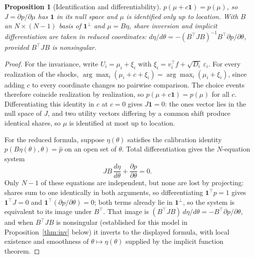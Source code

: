 \documentclass[12pt]{article}
\newtheorem{proposition}{Proposition}
\theoremstyle{remark}
\begin{document}
\begin{proposition}[Identification and differentiability]\label{prop:ident}
$p(\mu + c\mathbf{1}) = p(\mu)$, so $J = \partial p/\partial \mu$ has
$\mathbf{1}$ in its null space and $\mu$ is identified only up to location.
With $B$ an $N \times (N-1)$ basis of $\mathbf{1}^\perp$ and $\mu = B\eta$,
share inversion and implicit differentiation are taken in reduced coordinates:
$d\eta/d\theta = -(B^\top J B)^{-1} B^\top \partial p/\partial\theta$,
provided $B^\top J B$ is nonsingular.
\end{proposition}
\begin{proof}
For the invariance, write $U_i = \mu_i + \xi_i$ with $\xi_i = v_i^\top f
+ \sqrt{D_i}\,\varepsilon_i$. For every realization of the shocks,
$\arg\max_i (\mu_i + c + \xi_i) = \arg\max_i (\mu_i + \xi_i)$, since
adding $c$ to every coordinate changes no pairwise comparison. The choice
events therefore coincide realization by realization, so $p(\mu +
c\mathbf{1}) = p(\mu)$ for all $c$. Differentiating this identity in $c$
at $c = 0$ gives $J\mathbf{1} = 0$: the ones vector lies in the null space
of $J$, and two utility vectors differing by a common shift produce
identical shares, so $\mu$ is identified at most up to location.

For the reduced formula, suppose $\eta(\theta)$ satisfies the calibration
identity $p(B\eta(\theta), \theta) = \hat p$ on an open set of
$\theta$. Total differentiation gives the $N$-equation system
\[
J B \,\frac{d\eta}{d\theta} + \frac{\partial p}{\partial \theta}
= 0 .
\]
Only $N - 1$ of these equations are independent, but none are lost by
projecting: shares sum to one identically in both arguments, so
differentiating $\mathbf{1}^\top p = 1$ gives $\mathbf{1}^\top J = 0$
and $\mathbf{1}^\top (\partial p / \partial \theta) = 0$; both terms
already lie in $\mathbf{1}^\perp$, so the system is equivalent to its
image under $B^\top$. That image is $(B^\top J B)\, d\eta/d\theta =
-B^\top \partial p/\partial\theta$, and when $B^\top J B$ is
nonsingular (established for this model in Proposition~\ref{thm:inv} below) it
inverts to the displayed formula, with local existence and smoothness of
$\theta \mapsto \eta(\theta)$ supplied by the implicit function theorem.
\end{proof}
\end{document}
